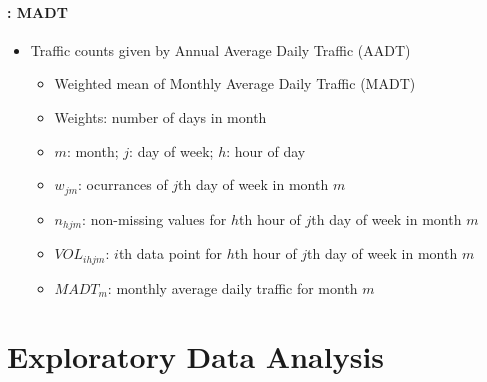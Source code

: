 \begin{frame}{\insertsectionhead}
	\framesubtitle{\insertsubsectionhead: MADT}
	\begin{itemize}
		\item<+-> Traffic counts given by \alert{Annual Average Daily Traffic} (AADT)
		\begin{itemize}
			\item<+-> Weighted mean of \alert{Monthly Average Daily Traffic} (MADT)
			\item<+-> Weights: number of days in month
		\end{itemize}
\begin{overlayarea}{\textwidth}{0.3\textheight}
		\only<+->{
		\[
			MADT_m = \frac{\sum_{j=1}^7 w_{jm} \sum_{h=1}^{24}\left[\frac{1}{n_{hjm}}\sum_{i=1}^{n_{hjm}}VOL_{ihjm}\right]}
			{\sum_{j=1}^7 w_{jm}}
		\]
		}
\end{overlayarea}

		\begin{itemize}
			\item<+-> $m$: month; $j$: day of week; $h$: hour of day
			\item<+-> $w_{jm}$: ocurrances of $j$th day of week in month $m$
			\item<+-> $n_{hjm}$: non-missing values for $h$th hour of $j$th day of week in month $m$
			\item<+-> $VOL_{ihjm}$: $i$th data point for $h$th hour of $j$th day of week in month $m$
			\item<+-> $MADT_m$: monthly average daily traffic for month $m$
		\end{itemize} 
	\end{itemize}
\end{frame}

\section{Exploratory Data Analysis}

